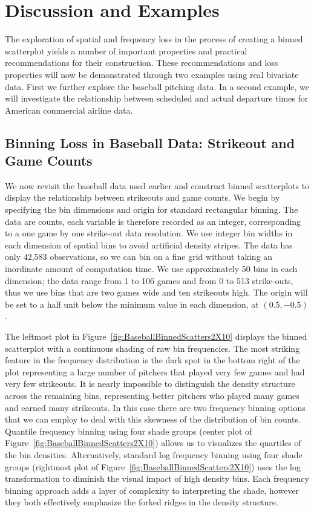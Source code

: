 \documentclass[11pt]{isuthesis}\usepackage[]{graphicx}\usepackage[]{color}
\begin{document}

\section{Discussion and Examples}

The exploration of spatial and frequency loss in the process of creating a binned scatterplot yields a number of important properties and practical recommendations for their construction. These recommendations and loss properties will now be demonstrated through two examples using real bivariate data. First we further explore the baseball pitching data. In a second example, we will investigate the relationship between scheduled and actual departure times for American commercial airline data. 

\subsection{Binning Loss in Baseball Data: Strikeout and Game Counts}



We now revisit the baseball data used earlier and construct binned scatterplots to display the relationship between strikeouts and game counts. We begin by specifying the bin dimensions and origin for standard rectangular binning. The data are counts, each variable is therefore recorded as an integer, corresponding to a one game by one strike-out data resolution. We use integer bin widths in each dimension of spatial bins to avoid artificial density stripes. The data has only 42,583 observations, so we can bin on a fine grid without taking an inordinate amount of computation time. We use approximately 50 bins in each dimension; the data range from 1 to 106 games and from 0 to 513 strike-outs, thus we use bins that are two games wide and ten strikeouts high. The origin will be set to a half unit below the minimum value in each dimension, at $(0.5,-0.5)$. 
 
The leftmost plot in Figure~\ref{fig:BaseballBinnedScatters2X10} displays the binned scatterplot with a continuous shading of raw bin frequencies. The most striking feature in the frequency distribution is the dark spot in the bottom right of the plot representing a large number of pitchers that played very few games and had very few strikeouts. It is nearly impossible to distinguish the density structure across the remaining bins, representing better pitchers who played many games and earned many strikeouts. 
In this case there are two frequency binning options that we can employ to deal with this skewness of the distribution of bin counts. Quantile frequency binning using four shade groups (center plot of Figure~\ref{fig:BaseballBinnedScatters2X10}) allows us to visualizes the quartiles of the bin densities. Alternatively, standard log frequency binning using four shade groups (rightmost plot of Figure~\ref{fig:BaseballBinnedScatters2X10}) uses the log transformation to diminish the visual impact of high density bins. Each frequency binning approach adds a layer of complexity to interpreting the shade, however they both effectively emphasize the forked ridges in the density structure. 
\end{document}
